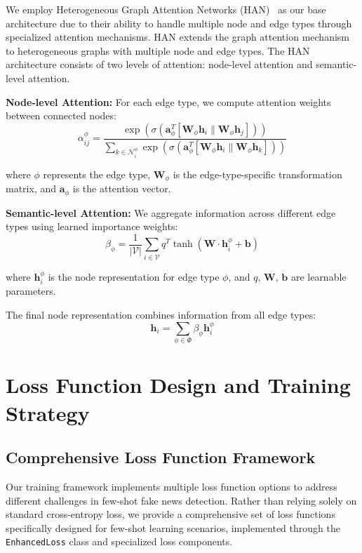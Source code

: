 We employ Heterogeneous Graph Attention Networks (HAN)~\cite{wang2019han} as our base architecture due to their ability to handle multiple node and edge types through specialized attention mechanisms. HAN extends the graph attention mechanism~\cite{veličković2018graph} to heterogeneous graphs with multiple node and edge types. The HAN architecture consists of two levels of attention: node-level attention and semantic-level attention.

\textbf{Node-level Attention:} For each edge type, we compute attention weights between connected nodes:
\begin{equation}
\alpha_{ij}^{\phi} = \frac{\exp(\sigma(\mathbf{a}_{\phi}^T[\mathbf{W}_{\phi}\mathbf{h}_i \| \mathbf{W}_{\phi}\mathbf{h}_j]))}{\sum_{k \in \mathcal{N}_i^{\phi}} \exp(\sigma(\mathbf{a}_{\phi}^T[\mathbf{W}_{\phi}\mathbf{h}_i \| \mathbf{W}_{\phi}\mathbf{h}_k]))}
\end{equation}

where $\phi$ represents the edge type, $\mathbf{W}_{\phi}$ is the edge-type-specific transformation matrix, and $\mathbf{a}_{\phi}$ is the attention vector.

\textbf{Semantic-level Attention:} We aggregate information across different edge types using learned importance weights:
\begin{equation}
\beta_{\phi} = \frac{1}{|\mathcal{V}|} \sum_{i \in \mathcal{V}} q^T \tanh(\mathbf{W} \cdot \mathbf{h}_i^{\phi} + \mathbf{b})
\end{equation}

where $\mathbf{h}_i^{\phi}$ is the node representation for edge type $\phi$, and $q$, $\mathbf{W}$, $\mathbf{b}$ are learnable parameters.

The final node representation combines information from all edge types:
\begin{equation}
\mathbf{h}_i = \sum_{\phi \in \Phi} \beta_{\phi} \mathbf{h}_i^{\phi}
\end{equation}

\section{Loss Function Design and Training Strategy}

\subsection{Comprehensive Loss Function Framework}

Our training framework implements multiple loss function options to address different challenges in few-shot fake news detection. Rather than relying solely on standard cross-entropy loss, we provide a comprehensive set of loss functions specifically designed for few-shot learning scenarios, implemented through the \texttt{EnhancedLoss} class and specialized loss components.

